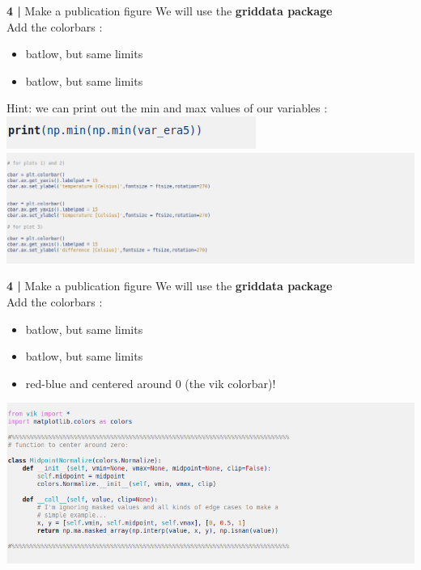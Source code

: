 \begin{frame}{\textbf{4 |} Make a publication figure} 
    We will use the \textbf{griddata package}\\
        \vspace{0.3cm} 
    Add the colorbars : \\
    \begin{itemize}
        \item batlow, but same limits
        \item batlow, but same limits
    \end{itemize}
    Hint: we can print out the min and max values of our variables :
    \includegraphics[scale=0.35]{images/hint.png}\\
    \includegraphics[scale=0.35]{images/Script5_step7.png}
\end{frame}


\begin{frame}{\textbf{4 |} Make a publication figure} 
    We will use the \textbf{griddata package}\\
        \vspace{0.3cm} 
    Add the colorbars : \\
    \begin{itemize}
        \item batlow, but same limits
        \item batlow, but same limits
        \item red-blue and centered around 0 (the vik colorbar)! 
    \end{itemize}
    \includegraphics[scale=0.35]{images/script5_step6.png}
\end{frame}


